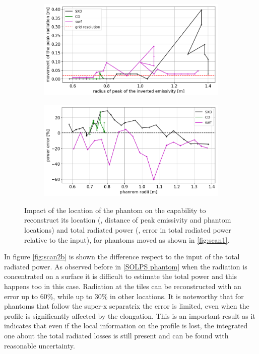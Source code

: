 \begin{figure}
    \centering
    \begin{subfigure}{0.7\linewidth}
         \centering
         \includegraphics[trim={0 0 0 0},clip,width=\textwidth]{Chapters/chapter2/figs/position_error.png}
         \caption{}
         \label{fig:scan2a}
    \end{subfigure}
    \begin{subfigure}{0.7\linewidth}
         \centering
         \includegraphics[trim={0 0 0 0},clip,width=\textwidth]{Chapters/chapter2/figs/power_error.png}
         \caption{}
         \label{fig:scan2b}
    \end{subfigure}
    \caption{Impact of the location of the phantom on the capability to reconstruct its location (, distance of peak emissivity and phantom locations) and total radiated power (, error in total radiated power relative to the input), for phantoms moved as shown in \autoref{fig:scan1}.}
    \label{fig:scan2}
\end{figure}

In figure \autoref{fig:scan2b} is shown the difference respect to the input of the total radiated power. As observed before in \autoref{SOLPS phantom} when the radiation is concentrated on a surface it is difficult to estimate the total power and this happens too in this case. Radiation at the tiles can be reconstructed with an error up to 60\%, while up to 30\% in other locations. It is noteworthy that for phantoms that follow the super-x separatrix the error is limited, even when the profile is significantly affected by the elongation. This is an important result as it indicates that even if the local information on the profile is lost, the integrated one about the total radiated losses is still present and can be found with reasonable uncertainty.


